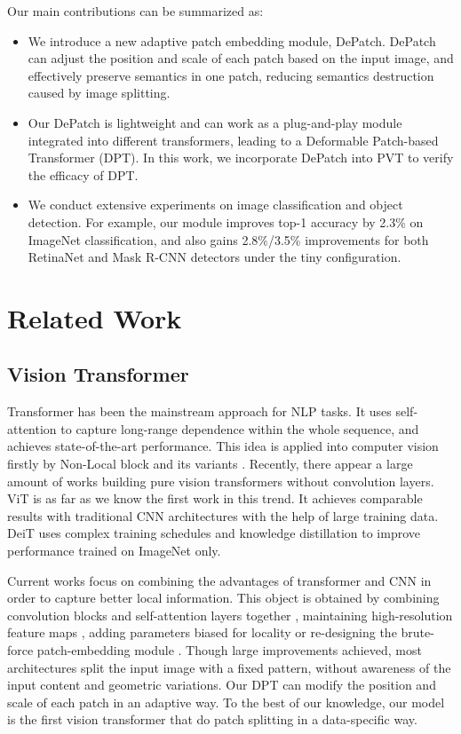 \documentclass[sigconf,screen]{acmart}
\begin{document}
Our main contributions can be summarized as:

\begin{itemize}
\item We introduce a new adaptive patch embedding module,  DePatch. 
DePatch can adjust the position and scale of each patch based on the input image, and effectively preserve semantics in one patch, reducing semantics destruction caused by image splitting.  
\item Our DePatch is lightweight and can work as a plug-and-play module integrated into different transformers, leading to a Deformable Patch-based Transformer (DPT). In this work, we incorporate DePatch into PVT to verify the efficacy of DPT.

\item We conduct extensive experiments on image classification and object detection. For example, our module improves top-1 accuracy by 2.3\% on ImageNet classification, and also gains 2.8\%/3.5\% improvements for both RetinaNet and Mask R-CNN detectors under the tiny configuration. 
\end{itemize}

\section{Related Work}
\subsection{Vision Transformer}
Transformer \cite{transformer} has been the mainstream approach for NLP tasks. It uses self-attention to capture long-range dependence within the whole sequence, and achieves state-of-the-art performance. This idea is applied into computer vision firstly by Non-Local block and its variants \cite{nonlocal,gcnet,ccnet}. Recently, there appear a large amount of works building pure vision transformers without convolution layers. ViT \cite{vit} is as far as we know the first work in this trend. It achieves comparable results with traditional CNN architectures with the help of large training data. DeiT \cite{deit} uses complex training schedules and knowledge distillation to improve performance trained on ImageNet only.

Current works focus on combining the advantages of transformer and CNN in order to capture better local information. This object is obtained by combining convolution blocks and self-attention layers together \cite{botnet,cpvt}, maintaining high-resolution feature maps \cite{tnt,pvt,swin}, adding parameters biased for locality \cite{smca,convit} or re-designing the brute-force patch-embedding module \cite{t2tvit}. Though large improvements achieved, most architectures split the input image with a fixed pattern, without awareness of the input content and geometric variations. Our DPT can modify the position and scale of each patch in an adaptive way. To the best of our knowledge, our model is the first vision transformer that do patch splitting in a data-specific way.
\end{document}
